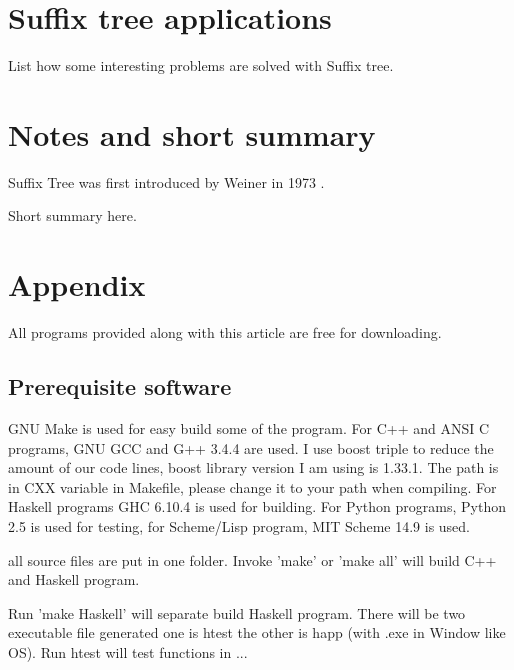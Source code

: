 \documentclass{article}
\begin{document}

\section{Suffix tree applications}

List how some interesting problems are solved with Suffix tree.

\section{Notes and short summary}

Suffix Tree was first introduced by Weiner in 1973 \cite{weiner}.

Short summary here.

\section{Appendix} \label{appendix}
All programs provided along with this article are free for
downloading.

\subsection{Prerequisite software}
GNU Make is used for easy build some of the program. For C++ and ANSI C programs,
GNU GCC and G++ 3.4.4 are used. I use boost triple to reduce the
amount of our code lines, boost library version I am using is
1.33.1. The path is in CXX variable in Makefile, please change it to
your path when compiling.
For Haskell programs GHC 6.10.4 is used
for building. For Python programs, Python 2.5 is used for testing, for
Scheme/Lisp program, MIT Scheme 14.9 is used.

all source files are put in one folder. Invoke 'make' or 'make all'
will build C++ and Haskell program. 

Run 'make Haskell' will separate build Haskell program. There will be
two executable file generated one is htest the other is happ (with .exe
in Window like OS). Run htest will test functions in ...
\end{document}
